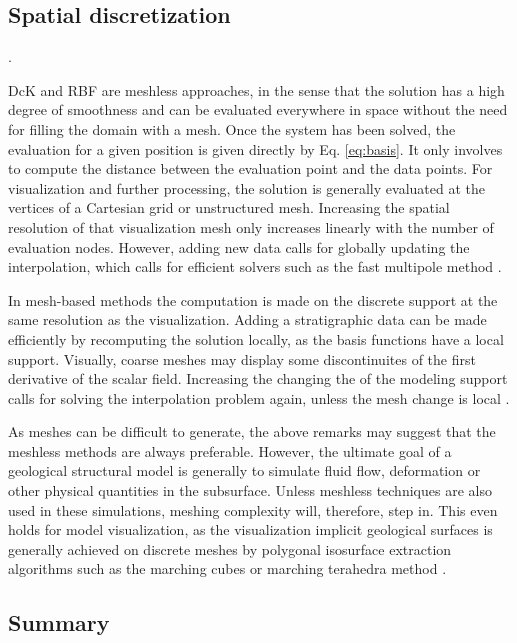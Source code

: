 \documentclass[final]{ring20}
\begin{document}
{\subsection{Spatial discretization}.

DcK and RBF are meshless approaches, in the sense that the solution has a high degree of smoothness and can be evaluated everywhere in space without the need for filling the domain with a mesh. Once the system has been solved, the evaluation for a given position is given directly by Eq. \ref{eq:basis}. It only involves to compute the distance between the evaluation point and the data points. For visualization and further processing, the solution is generally evaluated at the vertices of a Cartesian grid or unstructured mesh. Increasing the spatial resolution of that visualization mesh only increases linearly with the number of evaluation nodes. However, adding new data calls for globally updating the interpolation, which calls for efficient solvers such as the fast multipole method \citep{greengard_fast_1987}. 

In mesh-based methods the computation is made on the discrete support at the same resolution as the visualization. Adding a stratigraphic data can be made efficiently by recomputing the solution locally, as the basis functions have a local support. Visually, coarse meshes may display some discontinuites of the first derivative of the scalar field. Increasing the changing the of the modeling support calls for solving the interpolation problem again, unless the mesh change is local \citep{Frank2007CG}. 

As meshes can be difficult to generate, the above remarks may suggest that the meshless methods are always preferable. However, the ultimate goal of a geological structural model is generally to simulate fluid flow, deformation or other physical quantities in the subsurface. Unless meshless techniques are also used in these simulations, meshing complexity will, therefore, step in. This even holds for model visualization, as the visualization implicit geological surfaces is generally achieved on discrete meshes by polygonal isosurface extraction algorithms such as the marching cubes \citep{Calcagno2008PEPI} or marching terahedra method \citep{Frank2007CG}. 

\subsection{Summary}

}
\end{document}
